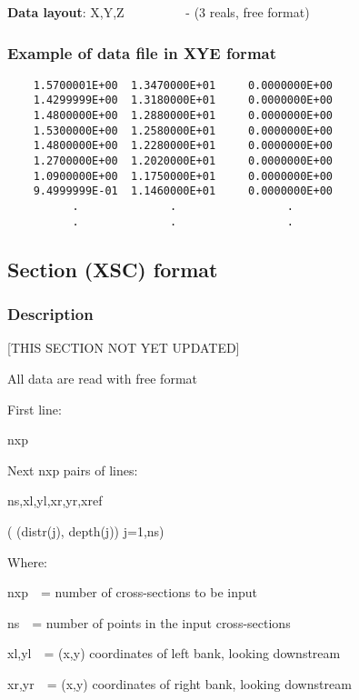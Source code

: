 \documentclass{article}
\begin{document}
\textbf{Data layout}:\newline
X,Y,Z \ \ \ \ \ \ \ \ \ {}- (3 reals, free format)\newline

\subsubsection{Example of data file in XYE format}

\begin{small}
\begin{lstlisting}
    1.5700001E+00  1.3470000E+01     0.0000000E+00   
    1.4299999E+00  1.3180000E+01     0.0000000E+00   
    1.4800000E+00  1.2880000E+01     0.0000000E+00   
    1.5300000E+00  1.2580000E+01     0.0000000E+00   
    1.4800000E+00  1.2280000E+01     0.0000000E+00   
    1.2700000E+00  1.2020000E+01     0.0000000E+00   
    1.0900000E+00  1.1750000E+01     0.0000000E+00   
    9.4999999E-01  1.1460000E+01     0.0000000E+00   
          .              .                 .     
          .              .                 .    
\end{lstlisting}
\end{small}

\newpage
\subsection[Section (XSC) format]{Section (XSC) format}
\subsubsection[Description]{Description}
[THIS SECTION NOT YET UPDATED]
\bigskip

All data are read with free format

First line:

nxp

Next nxp pairs of lines:

ns,xl,yl,xr,yr,xref

( (distr(j), depth(j)) j=1,ns)


\bigskip


\bigskip

Where:

nxp\ \ = number of cross-sections to be input

ns\ \ = number of points in the input cross-sections

xl,yl\ \ = (x,y) coordinates of left bank, looking downstream

xr,yr\ \ = (x,y) coordinates of right bank, looking downstream
\end{document}
